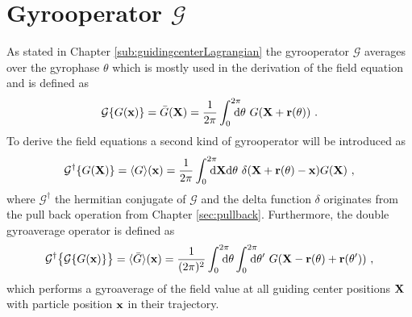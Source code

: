 \section{Gyrooperator $\mathcal{G}$}
\label{sec:gyroOperator}

As stated in Chapter \ref{sub:guidingcenterLagrangian} the gyrooperator $\mathcal{G}$ averages over the gyrophase $\theta$ which is mostly used in the derivation of the field equation and is defined as
\begin{gather}
    \mathcal{G} \{G(\boldsymbol{\mathbf{x}})\} = \bar{G}(\boldsymbol{\mathbf{X}}) = \frac{1}{2\pi} \int_{0}^{2\pi} \!\!\!\!\! \mathrm{d}\theta ~ G(\boldsymbol{\mathbf{X}} + \boldsymbol{\mathbf{r}}(\theta))~.
    \label{eq:gyroOperatorRevision}
\end{gather}
To derive the field equations a second kind of gyrooperator will be introduced as
\begin{gather}
    \mathcal{G}^\dagger \{G(\boldsymbol{\mathbf{X}})\} = \langle G\rangle(\boldsymbol{\mathbf{x}}) = \frac{1}{2\pi} \int_{0}^{2\pi} \!\!\!\!\! \mathrm{d}\boldsymbol{\mathbf{X}}\mathrm{d}\theta ~ \delta(\boldsymbol{\mathbf{X}} + \boldsymbol{\mathbf{r}}(\theta) - \boldsymbol{\mathbf{x}}) G(\boldsymbol{\mathbf{X}})~,
    \label{eq:gyroOperatorDagger}
\end{gather}
where $\mathcal{G}^\dagger$ the hermitian conjugate of $\mathcal{G}$\cite{Told_PHD} and the delta function $\delta$ originates from the pull back operation from Chapter \ref{sec:pullback}.\cite{Merlo_PHD} Furthermore, the double gyroaverage operator is defined as
\begin{gather}
    \tgad{\bigl\{ \tga{\{G(\x)\}} \bigr\}} = \gad{\ga{G}}(\x) = \frac{1}{(2\pi)^2} \intss{0}{2\pi} \dtheta \intss{0}{2\pi} \dtheta' ~ G(\X - \rrho(\theta) + \rrho(\theta'))~,
    \label{eq:gyroOperatorDouble}
\end{gather}
which performs a gyroaverage of the field value at all guiding center positions $\boldsymbol{\mathbf{X}}$ with particle position $\boldsymbol{\mathbf{x}}$ in their trajectory. \cite{Maurer_PHD}

